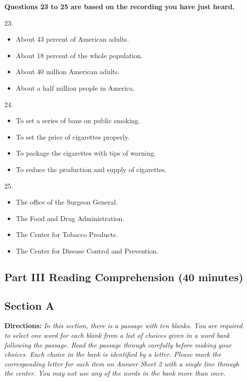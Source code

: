 \documentclass[UTF8,11pt]{ctexart}
\begin{document}
\textbf{Questions 23 to 25 are based on the recording you have just heard.}


23.


\begin{itemize}[leftmargin=2em,itemsep=.2em,topsep=.4em]\item[A.] About 43 percent of American adults.
\item[B.] About 18 percent of the whole population.
\item[C.] About 40 million American adults.
\item[D.] About a half million people in America.
\end{itemize}

24.


\begin{itemize}[leftmargin=2em,itemsep=.2em,topsep=.4em]\item[A.] To set a series of bans on public smoking.
\item[B.] To set the price of cigarettes properly.
\item[C.] To package the cigarettes with tips of warning.
\item[D.] To reduce the production and supply of cigarettes.
\end{itemize}

25.


\begin{itemize}[leftmargin=2em,itemsep=.2em,topsep=.4em]\item[A.] The office of the Surgeon General.
\item[B.] The Food and Drug Administration.
\item[C.] The Center for Tobacco Products.
\item[D.] The Center for Disease Control and Prevention.
\end{itemize}

\subsection*{\textbf{Part III Reading Comprehension (40 minutes)}}


\subsection*{\textbf{Section A}}


\textbf{Directions:} \textit{In this section, there is a passage with ten blanks. You are required to select one word for each blank} \textit{from a list of choices given in a word bank following the passage. Read the passage through carefully before making} \textit{your choices. Each choice in the bank is identified by a letter. Please mark the corresponding letter for each item on} \textit{Answer Sheet 2 with a single line through the center. You may not use any of the words in the bank more than once.}
\end{document}
